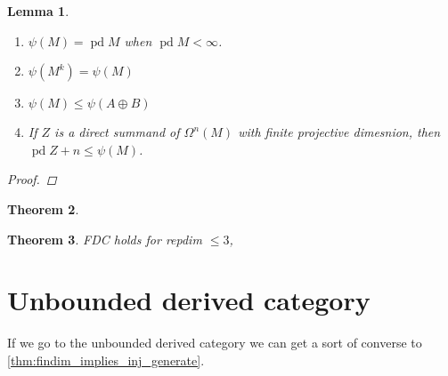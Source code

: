 \documentclass[11pt, a4paper, english]{article}
\newtheorem{theorem}{Theorem}[section]
\newtheorem{lemma}[theorem]{Lemma}
\theoremstyle{definition}
\DeclareMathOperator{\pd}{pd}
\begin{document}
\begin{lemma} \cite[Lemma~3]{IgTo05}
	\begin{enumerate}
		\item $\psi(M) = \pd M$ when $\pd M < \infty$.
		\item $\psi(M^k) = \psi(M)$
		\item $\psi(M) \leq \psi(A\oplus B)$
		\item If $Z$ is a direct summand of $\Omega^n(M)$ with finite projective dimesnion, then $\pd Z + n \leq \psi(M)$.
	\end{enumerate}
	\begin{proof}
	\end{proof}
\end{lemma}

\begin{theorem}\cite[Theorem~4]{IgTo05}
	
\end{theorem}

\begin{theorem}\cite[Corollary~8,9]{IgTo05}
	FDC holds for repdim $\leq 3$, 
\end{theorem}

\section{Unbounded derived category}

If we go to the unbounded derived category we can get a sort of converse to \cref{thm:findim_implies_inj_generate}.
\end{document}
